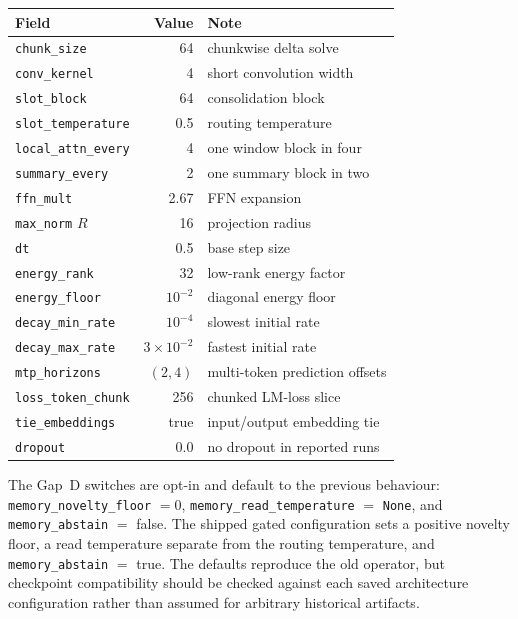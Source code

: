 \begin{center}
\small
{}
\label{tab:defaults}
\begin{tabularx}{\textwidth}{@{}l r X@{}}
\toprule
Field & Value & Note \\
\midrule
\texttt{chunk\_size} & 64 & chunkwise delta solve \\
\texttt{conv\_kernel} & 4 & short convolution width \\
\texttt{slot\_block} & 64 & consolidation block \\
\texttt{slot\_temperature} & 0.5 & routing temperature \\
\texttt{local\_attn\_every} & 4 & one window block in four \\
\texttt{summary\_every} & 2 & one summary block in two \\
\texttt{ffn\_mult} & 2.67 & FFN expansion \\
\texttt{max\_norm} $R$ & 16 & projection radius \\
\texttt{dt} & 0.5 & base step size \\
\texttt{energy\_rank} & 32 & low-rank energy factor \\
\texttt{energy\_floor} & $10^{-2}$ & diagonal energy floor \\
\texttt{decay\_min\_rate} & $10^{-4}$ & slowest initial rate \\
\texttt{decay\_max\_rate} & $3\times10^{-2}$ & fastest initial rate \\
\texttt{mtp\_horizons} & $(2,4)$ & multi-token prediction offsets \\
\texttt{loss\_token\_chunk} & 256 & chunked LM-loss slice \\
\texttt{tie\_embeddings} & true & input/output embedding tie \\
\texttt{dropout} & 0.0 & no dropout in reported runs \\
\bottomrule
\end{tabularx}
\end{center}

The Gap~D switches are opt-in and default to the previous behaviour:
\texttt{memory\_novelty\_floor} $=0$, \texttt{memory\_read\_temperature} $=$ \texttt{None}, and
\texttt{memory\_abstain} $=$ false. The shipped gated configuration sets a positive novelty
floor, a read temperature separate from the routing temperature, and
\texttt{memory\_abstain} $=$ true. The defaults reproduce the old operator, but checkpoint
compatibility should be checked against each saved architecture configuration rather than
assumed for arbitrary historical artifacts.

